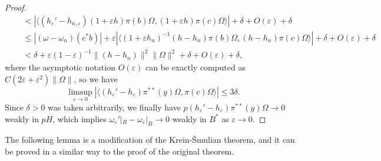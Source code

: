 \documentclass[a4paper]{amsart}
\newcommand{\e}{\varepsilon}
\theoremstyle{plain}
\theoremstyle{definition}
\begin{document}
\begin{proof}
\begin{align*}
&\quad<|\langle(h_\e'-h_{n,\e})(1+\e h)\pi(b)\Omega,(1+\e h)\pi(c)\Omega\rangle|+\delta+O(\e)+\delta\\
&\quad\le|(\omega-\omega_n)(c^*b)|+\e|\langle(1+\e h_n)^{-1}(h-h_n)\pi(b)\Omega,(h-h_n)\pi(c)\Omega\rangle|+\delta+O(\e)+\delta\\
&\quad<\delta+\e(1-\e)^{-1}\|(h-h_n)\|^2\|\Omega\|^2+\delta+O(\e)+\delta,
\end{align*}
where the asymptotic notation $O(\e)$ can be exactly computed as $C(2\e+\e^2)\|\Omega\|$, so we have
\[\limsup_{\e\to0}|\langle(h_\e'-h_\e)\pi^{**}(y)\Omega,\pi(c)\Omega\rangle|\le3\delta.\]
Since $\delta>0$ was taken arbitrarily, we finally have $p(h_\e'-h_\e)\pi^{**}(y)\Omega\to0$ weakly in $pH$, which implies $\omega_\e'|_B-\omega_\e|_B\to0$ weakly in $B^*$ as $\e\to0$.
\end{proof}


The following lemma is a modification of the Krein-\v Smulian theorem, and it can be proved in a similar way to the proof of the original theorem.
\end{document}
